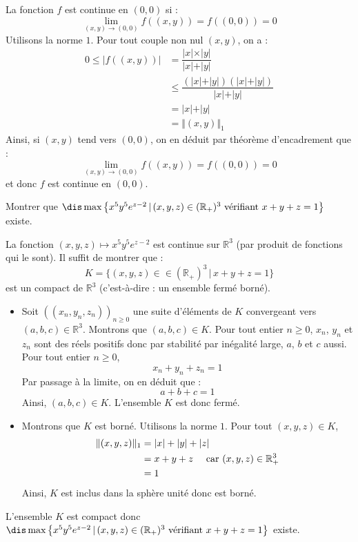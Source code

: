 \documentclass[a4paper,10pt]{report}
\begin{document}
\corr La fonction $f$ est continue en $(0,0)$ si :
$$ \lim_{(x,y) \rightarrow (0,0)} f((x,y)) =f((0,0))= 0$$
Utilisons la norme $1$. Pour tout couple non nul $(x,y)$, on a :
\begin{align*}
0 \leq \vert f((x,y)) \vert & = \dfrac{\vert x \vert \times \vert y \vert}{\vert x \vert + \vert y \vert} \\
& \leq \dfrac{(\vert x \vert + \vert y \vert)(\vert x \vert + \vert y \vert)}{\vert x \vert + \vert y \vert} \\
& = \vert x \vert + \vert y \vert \\
& = \Vert (x,y) \Vert_1
\end{align*}
Ainsi, si $(x,y)$ tend vers $(0,0)$, on en déduit par théorème d'encadrement que :
$$  \lim_{(x,y) \rightarrow (0,0)} f((x,y)) =f((0,0))= 0$$
et donc $f$ est continue en $(0,0)$.




\begin{Exercice}{} Montrer que $\dis \max \left\lbrace x^5y^5 e^{z-2} \, \vert \, (x,y,z) \in (\mathbb{R}_+)^3 \hbox{ vérifiant } x+y+z =1 \right\rbrace$ existe.
\end{Exercice}

\corr La fonction $(x,y,z) \mapsto x^5y^5 e^{z-2}$ est continue sur $\mathbb{R}^3$ (par produit de fonctions qui le sont). Il suffit de montrer que :
$$K= \lbrace (x,y,z) \in \in (\mathbb{R}_+)^3 \, \vert \, x+y+z=1 \rbrace$$
est un compact de $\mathbb{R}^3$ (c'est-à-dire : un ensemble fermé borné).

\begin{itemize}
\item Soit $((x_n,y_n,z_n))_{n \geq 0}$ une suite d'éléments de $K$ convergeant vers $(a,b,c) \in \mathbb{R}^3$. Montrons que $(a,b,c) \in K$. Pour tout entier $n \geq 0$, $x_n$, $y_n$ et $z_n$ sont des réels positifs donc par stabilité par inégalité large, $a$, $b$ et $c$ aussi. Pour tout entier $n \geq 0$,
$$ x_n + y_n + z_n = 1$$
Par passage à la limite, on en déduit que :
$$ a+b+c=1$$
Ainsi, $(a,b,c) \in K$. L'ensemble $K$ est donc fermé.
\item Montrons que $K$ est borné. Utilisons la norme $1$. Pour tout $(x,y,z) \in K$,
\begin{align*}
\Vert (x,y,z) \Vert_1 & = \vert x \vert + \vert y \vert + \vert z \vert \\
& = x+y+z \quad \hbox{ car } (x,y,z) \in \mathbb{R}_+^{3} \\
& = 1
\end{align*}
Ainsi, $K$ est inclus dans la sphère unité donc est borné.
\end{itemize}
L'ensemble $K$ est compact donc $\dis \max \left\lbrace x^5y^5 e^{z-2} \, \vert \, (x,y,z) \in (\mathbb{R}_+)^3 \hbox{ vérifiant } x+y+z =1 \right\rbrace$ existe.
\end{document}
